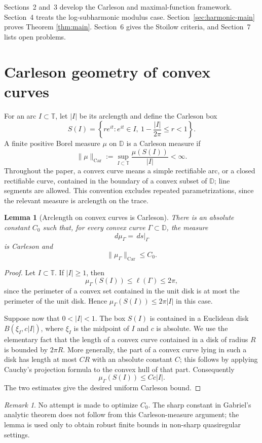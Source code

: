 \documentclass[11pt]{article}
\newtheorem{lemma}[theorem]{Lemma}
\theoremstyle{definition}
\theoremstyle{remark}
\newtheorem{remark}[theorem]{Remark}
\newcommand{\D}{\mathbb D}
\newcommand{\T}{\mathbb T}
\newcommand{\ds}{\,ds}
\newcommand{\Car}{\operatorname{Car}}
\begin{document}
Sections~2 and~3 develop the Carleson and maximal-function framework. Section~4 treats the log-subharmonic modulus case. Section~\ref{sec:harmonic-main} proves Theorem \ref{thm:main}. Section~6 gives the Stoilow criteria, and Section~7 lists open problems.

\section{Carleson geometry of convex curves}

For an arc $I\subset\T$, let $|I|$ be its arclength and define the Carleson box
\[
   S(I)=\left\{re^{it}: e^{it}\in I,
   \ 1-\frac{|I|}{2\pi}\le r<1\right\}.
\]
A finite positive Borel measure $\mu$ on $\D$ is a Carleson measure if
\[
   \|\mu\|_{\Car}:=\sup_{I\subset\T}\frac{\mu(S(I))}{|I|}<\infty.
\]
Throughout the paper, a convex curve means a simple rectifiable arc, or a closed rectifiable curve, contained in the boundary of a convex subset of $\D$; line segments are allowed. This convention excludes repeated parametrizations, since the relevant measure is arclength on the trace.

\begin{lemma}[Arclength on convex curves is Carleson]\label{lem:convex-carleson}
There is an absolute constant $C_0$ such that, for every convex curve $\Gamma\subset\D$, the measure
\[
   d\mu_\Gamma=\ds|_\Gamma
\]
is Carleson and
\[
   \|\mu_\Gamma\|_{\Car}\le C_0.
\]
\end{lemma}

\begin{proof}
Let $I\subset\T$. If $|I|\ge1$, then
\[
   \mu_\Gamma(S(I))\le \ell(\Gamma)\le 2\pi,
\]
since the perimeter of a convex set contained in the unit disk is at most the perimeter of the unit disk. Hence $\mu_\Gamma(S(I))\le 2\pi |I|$ in this case.

Suppose now that $0<|I|<1$. The box $S(I)$ is contained in a Euclidean disk $B(\xi_I,c|I|)$, where $\xi_I$ is the midpoint of $I$ and $c$ is absolute. We use the elementary fact that the length of a convex curve contained in a disk of radius $R$ is bounded by $2\pi R$. More generally, the part of a convex curve lying in such a disk has length at most $C R$ with an absolute constant $C$; this follows by applying Cauchy's projection formula to the convex hull of that part. Consequently
\[
   \mu_\Gamma(S(I))\le Cc|I|.
\]
The two estimates give the desired uniform Carleson bound.
\end{proof}

\begin{remark}
No attempt is made to optimize $C_0$. The sharp constant in Gabriel's analytic theorem does not follow from this Carleson-measure argument; the lemma is used only to obtain robust finite bounds in non-sharp quasiregular settings.
\end{remark}
\end{document}
